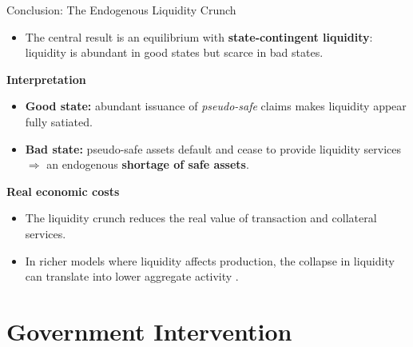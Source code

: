 \documentclass[11pt,aspectratio=169]{beamer}
\begin{document}
\begin{frame}{Conclusion: The Endogenous Liquidity Crunch}
\small
\begin{itemize}
  \item The central result is an equilibrium with \textbf{state-contingent liquidity}:
  liquidity is abundant in good states but scarce in bad states.
\end{itemize}

\vspace{0.3cm}
\textbf{Interpretation}
\begin{itemize}
  \item \textbf{Good state:} abundant issuance of \emph{pseudo-safe} claims makes liquidity appear fully satiated.
  \item \textbf{Bad state:} pseudo-safe assets default and cease to provide liquidity services
  $\Rightarrow$ an endogenous \textbf{shortage of safe assets}.
\end{itemize}

\vspace{0.3cm}
\textbf{Real economic costs}
\begin{itemize}
  \item The liquidity crunch reduces the real value of transaction and collateral services.
  \item In richer models where liquidity affects production, the collapse in liquidity can translate into lower aggregate activity
  \parencite{benigno2017}.
\end{itemize}
\end{frame}


\section{Government Intervention}
\end{document}

